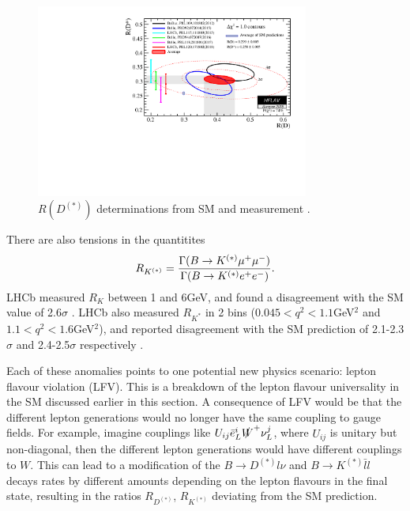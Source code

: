 \begin{figure}
  \begin{center}
    \includegraphics[width=
      0.8\textwidth]{images/rdrds_summer18.pdf}
  \end{center}
  \caption{$R(D^{(*)})$ determinations from SM and measurement
    \cite{HFLAV16}.
    \label{fig:ratiotension}}
\end{figure}

There are also tensions in the quantitites \cite{Altmannshofer:2017yso}
\begin{align}
  R_{K^{(*)}} = {\Gamma( B\to K^{(*)}\mu^+\mu^-)\over \Gamma( B\to K^{(*)} e^+e^-)}.
\end{align}
LHCb measured $R_K$ between 1 and 6GeV, and found a disagreement with the SM value \cite{Bobeth:2007dw,Bouchard:2013mia} of 2.6$\sigma$ \cite{Aaij:2014ora}. LHCb also measured $R_{K^*}$ in 2 bins ($0.045<q^2<1.1 $GeV$^2$ and $1.1<q^2<1.6$GeV$^2$), and reported disagreement with the SM prediction \cite{Bordone:2016gaq,Descotes-Genon:2015uva,Capdevila:2016ivx,Capdevila:2017ert,Serra:2016ivr,Straub:2015ica,Altmannshofer:2017fio,Jager:2014rwa} of 2.1-2.3$\sigma$ and 2.4-2.5$\sigma$ respectively \cite{Aaij:2017vbb}.


Each of these anomalies points to one potential new physics scenario: lepton flavour violation (LFV). This is a breakdown of the lepton flavour universality in the SM discussed earlier in this section. A consequence of LFV would be that the different lepton generations would no longer have the same coupling to gauge fields. For example, imagine couplings like $U_{ij} \bar{e}_L^i \slashed{W}^+ \nu_L^j$, where $U_{ij}$ is unitary but non-diagonal, then the different lepton generations would have different couplings to $W$. This can lead to a modification of the $B\to D^{(*)}l\nu$ and $B\to K^{(*)}\bar{l}l$ decays rates by different amounts depending on the lepton flavours in the final state, resulting in the ratios $R_{D^{(*)}}$, $R_{K^{(*)}}$ deviating from the SM prediction.

